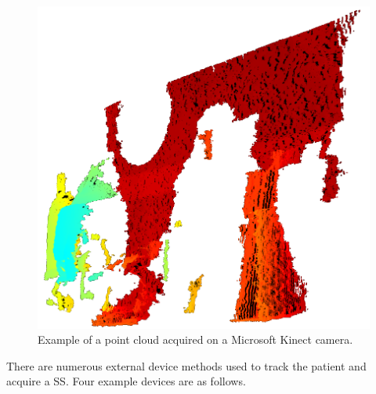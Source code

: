                 \begin{figure}
                    \centering
                    
                    \includegraphics[width=1.0\linewidth]{figures/background_3dpc_example.png}
                    
                    \captionsetup{singlelinecheck=false, justification=raggedright}
                    \caption{Example of a point cloud acquired on a Microsoft Kinect camera.}
                    \label{fig:external_devices_3dpc_example}
                \end{figure}
                
                There are numerous external device methods used to track the patient and acquire a \gls{SS}.  Four example devices are as follows.
                
